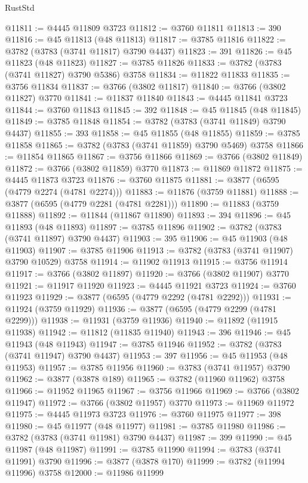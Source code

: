 \begin{lexlean}{RustStd}
\begin{coremodule}
@11811 := @4445 @11809 @3723
@11812 := @3760 @11811
@11813 := 390
@11816 := @45 @11813 (@48 @11813)
@11817 := @3785 @11816
@11822 := @3782 (@3783 (@3741 @11817) @3790 @4437)
@11823 := 391
@11826 := @45 @11823 (@48 @11823)
@11827 := @3785 @11826
@11833 := @3782 (@3783 (@3741 @11827) @3790 @5386) @3758
@11834 := @11822 @11833
@11835 := @3756 @11834
@11837 := @3766 (@3802 @11817)
@11840 := @3766 (@3802 @11827) @3770
@11841 := @11837 @11840
@11843 := @4445 @11841 @3723
@11844 := @3760 @11843
@11845 := 392
@11848 := @45 @11845 (@48 @11845)
@11849 := @3785 @11848
@11854 := @3782 (@3783 (@3741 @11849) @3790 @4437)
@11855 := 393
@11858 := @45 @11855 (@48 @11855)
@11859 := @3785 @11858
@11865 := @3782 (@3783 (@3741 @11859) @3790 @5469) @3758
@11866 := @11854 @11865
@11867 := @3756 @11866
@11869 := @3766 (@3802 @11849)
@11872 := @3766 (@3802 @11859) @3770
@11873 := @11869 @11872
@11875 := @4445 @11873 @3723
@11876 := @3760 @11875
@11881 := @3877 (@6595 (@4779 @2274 (@4781 @2274)))
@11883 := @11876 (@3759 @11881)
@11888 := @3877 (@6595 (@4779 @2281 (@4781 @2281)))
@11890 := @11883 (@3759 @11888)
@11892 := @11844 (@11867 @11890)
@11893 := 394
@11896 := @45 @11893 (@48 @11893)
@11897 := @3785 @11896
@11902 := @3782 (@3783 (@3741 @11897) @3790 @4437)
@11903 := 395
@11906 := @45 @11903 (@48 @11903)
@11907 := @3785 @11906
@11913 := @3782 (@3783 (@3741 @11907) @3790 @10529) @3758
@11914 := @11902 @11913
@11915 := @3756 @11914
@11917 := @3766 (@3802 @11897)
@11920 := @3766 (@3802 @11907) @3770
@11921 := @11917 @11920
@11923 := @4445 @11921 @3723
@11924 := @3760 @11923
@11929 := @3877 (@6595 (@4779 @2292 (@4781 @2292)))
@11931 := @11924 (@3759 @11929)
@11936 := @3877 (@6595 (@4779 @2299 (@4781 @2299)))
@11938 := @11931 (@3759 @11936)
@11940 := @11892 (@11915 @11938)
@11942 := @11812 (@11835 @11940)
@11943 := 396
@11946 := @45 @11943 (@48 @11943)
@11947 := @3785 @11946
@11952 := @3782 (@3783 (@3741 @11947) @3790 @4437)
@11953 := 397
@11956 := @45 @11953 (@48 @11953)
@11957 := @3785 @11956
@11960 := @3783 (@3741 @11957) @3790
@11962 := @3877 (@3878 @189)
@11965 := @3782 (@11960 @11962) @3758
@11966 := @11952 @11965
@11967 := @3756 @11966
@11969 := @3766 (@3802 @11947)
@11972 := @3766 (@3802 @11957) @3770
@11973 := @11969 @11972
@11975 := @4445 @11973 @3723
@11976 := @3760 @11975
@11977 := 398
@11980 := @45 @11977 (@48 @11977)
@11981 := @3785 @11980
@11986 := @3782 (@3783 (@3741 @11981) @3790 @4437)
@11987 := 399
@11990 := @45 @11987 (@48 @11987)
@11991 := @3785 @11990
@11994 := @3783 (@3741 @11991) @3790
@11996 := @3877 (@3878 @170)
@11999 := @3782 (@11994 @11996) @3758
@12000 := @11986 @11999

\end{coremodule}
\end{lexlean}
